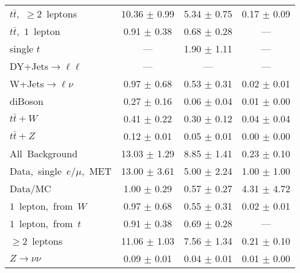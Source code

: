 \documentclass{article}
\begin{document}
\begin{longtable}{|l|c|c|c|}
$t\bar{t}$,~$\ge2$~leptons & 10.36 $\pm$ 0.99  & 5.34 $\pm$ 0.75  & 0.17 $\pm$ 0.09 \\* 
$t\bar{t}$,~$1$~lepton & 0.91 $\pm$ 0.38  & 0.68 $\pm$ 0.28  & --- \\* 
single $t$  & ---  & 1.90 $\pm$ 1.11  & --- \\* 
DY+Jets$\rightarrow\ell\ell$  & ---  & ---  & --- \\* 
W+Jets$\rightarrow\ell\nu$  & 0.97 $\pm$ 0.68  & 0.53 $\pm$ 0.31  & 0.02 $\pm$ 0.01 \\* 
diBoson  & 0.27 $\pm$ 0.16  & 0.06 $\pm$ 0.04  & 0.01 $\pm$ 0.00 \\* 
$t\bar{t}+W$  & 0.41 $\pm$ 0.22  & 0.30 $\pm$ 0.12  & 0.04 $\pm$ 0.04 \\* 
$t\bar{t}+Z$  & 0.12 $\pm$ 0.01  & 0.05 $\pm$ 0.01  & 0.00 $\pm$ 0.00 \\* 
\hline \hline 
All~Background  & 13.03 $\pm$ 1.29  & 8.85 $\pm$ 1.41  & 0.23 $\pm$ 0.10 \\* 
Data,~single~$e/\mu$,~MET  & 13.00 $\pm$ 3.61  & 5.00 $\pm$ 2.24  & 1.00 $\pm$ 1.00 \\* 
Data/MC  & 1.00 $\pm$ 0.29  & 0.57 $\pm$ 0.27  & 4.31 $\pm$ 4.72 \\* 
\hline \hline 
$1$~lepton,~from~$W$  & 0.97 $\pm$ 0.68  & 0.55 $\pm$ 0.31  & 0.02 $\pm$ 0.01 \\* 
$1$~lepton,~from~$t$  & 0.91 $\pm$ 0.38  & 0.69 $\pm$ 0.28  & --- \\* 
$\ge2$~leptons  & 11.06 $\pm$ 1.03  & 7.56 $\pm$ 1.34  & 0.21 $\pm$ 0.10 \\* 
$Z\rightarrow\nu\nu$  & 0.09 $\pm$ 0.01  & 0.04 $\pm$ 0.01  & 0.01 $\pm$ 0.00 \\* 
\hline 
\end{longtable} 

 
 
 
 
\pagebreak 

 
 
 
 
\end{document}
